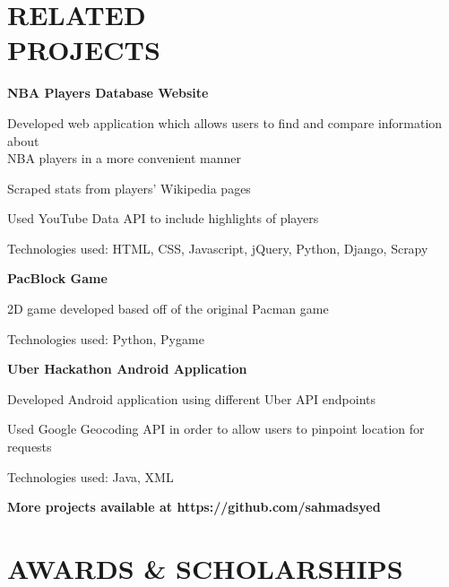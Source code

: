 \documentclass[margin,line]{resume}
\begin{document}
\begin{resume}
\sectionline\vspace{1mm}

    \section{\mysidestyle \textbf{\large{R}\small{ELATED\\PROJECTS}}} 
    
    \textbf{\listing NBA Players Database Website}\vspace{2mm}
    \begin{list2}
        \item Developed web application which allows users to find and compare information about \\NBA players in a more convenient manner
        \item Scraped stats from players' Wikipedia pages
        \item Used YouTube Data API to include highlights of players
        \item Technologies used: HTML, CSS, Javascript, jQuery, Python, Django, Scrapy
    \end{list2}
    \vspace{-0.5mm}
    \textbf{\listing PacBlock Game}\vspace{2mm}
    \begin{list2}
        \item 2D game developed based off of the original Pacman game
        \item Technologies used: Python, Pygame
    \end{list2}
    \vspace{-0.5mm}
    \textbf{\listing Uber Hackathon Android Application}\vspace{2mm}
    \begin{list2}
        \item Developed Android application using different Uber API endpoints
        \item Used Google Geocoding API in order to allow users to pinpoint location for requests
        \item Technologies used: Java, XML
    \end{list2}
    \textbf{More projects available at https://github.com/sahmadsyed}
\sectionline\vspace{1mm}

    \section{\mysidestyle \textbf{\large{A}\small{WARDS \& SCHOLARSHIPS}}}
    

\end{resume}
\end{document}
